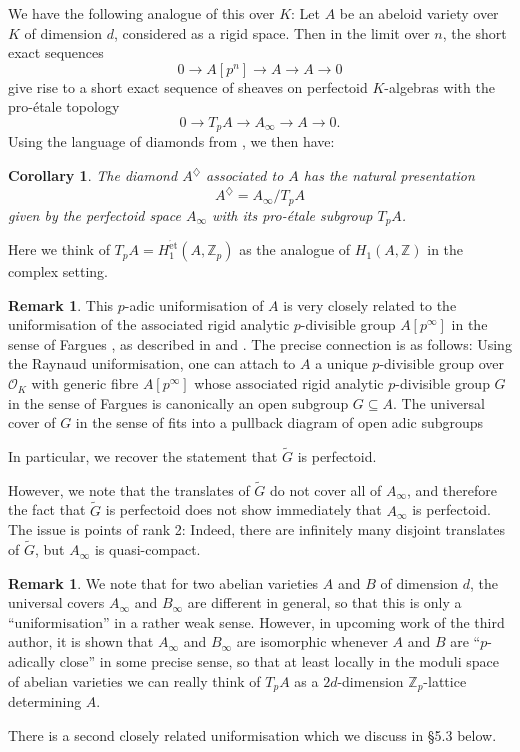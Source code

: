 \documentclass[10pt,oneside]{amsart}
\newtheorem{corollary}[theorem]{Corollary}
\theoremstyle{definition}
\newtheorem{remark}[theorem]{Remark}
\newcommand{\et}{\operatorname{\acute{e}t}}
\newcommand{\Z}{\mathbb{Z}}
\begin{document}
	We have the following analogue of this over $K$: Let $A$ be an abeloid variety over $K$ of dimension $d$, considered as a rigid space. Then in the limit over $n$, the short exact sequences
	\[ 0\to A[p^n]\to A\to A\to 0\]
	give rise to a short exact sequence of sheaves on perfectoid $K$-algebras with the pro-\'etale topology
	\[0\to T_pA \to A_\infty \to A\to 0.\]
	Using the language of diamonds from \cite{etale_cohomology_of_diamonds}, we then have:
	\begin{corollary}
		The diamond $A^{\diamondsuit}$ associated to $A$ has the natural presentation
		\[A^{\diamondsuit} = A_\infty/T_pA \]
		given by the perfectoid space $A_\infty$ with its pro-\'etale subgroup $T_pA$.
	\end{corollary}
	Here we think of $T_pA=H^{\et}_1(A,\Z_p)$ as the analogue of $H_1(A,\Z)$ in the complex setting.
\begin{remark}
	This $p$-adic uniformisation of $A$ is very closely related to the uniformisation of the associated rigid analytic $p$-divisible group $A[p^\infty]$ in the sense of Fargues \cite{Fargues-groupes-analytiques}, as described in \cite{SW} and \cite[\S4]{survey}. The precise connection is as follows: Using the Raynaud uniformisation, one can attach to $A$ a unique $p$-divisible group over $\mathcal O_K$ with generic fibre $A[p^\infty]$ whose associated rigid analytic $p$-divisible group $G$ in the sense of Fargues \cite{Fargues-groupes-analytiques} is canonically an open subgroup $G\subseteq A$. The universal cover of $G$ in the sense of \cite[\S 3.1]{SW} fits into a pullback diagram of open adic subgroups
	\begin{center}
	\end{center}
	In particular, we recover the statement that $\widetilde{G}$ is perfectoid. 
	
	However, we note that the translates of $\widetilde{G}$ do not cover all of $A_\infty$, and therefore the fact that $\widetilde{G}$ is perfectoid does not show immediately that $A_\infty$ is perfectoid.  The issue is points of rank 2: Indeed, there are infinitely many disjoint translates of $\widetilde G$, but $A_\infty$ is quasi-compact.
\end{remark}
	\begin{remark}
	We note that for two abelian varieties $A$ and $B$ of dimension $d$, the universal covers $A_\infty$ and $B_\infty$ are different in general, so that this is only a ``uniformisation'' in a rather weak sense. However, in upcoming work of the third author, it is shown that $A_\infty$ and $B_\infty$ are isomorphic whenever $A$ and $B$ are ``$p$-adically close'' in some precise sense,  so that at least locally in the moduli space of abelian varieties we can really think of $T_pA$ as a $2d$-dimension $\mathbb Z_p$-lattice determining $A$.
	\end{remark}
	 There is a second closely related uniformisation which we discuss in \S5.3 below.
\end{document}
